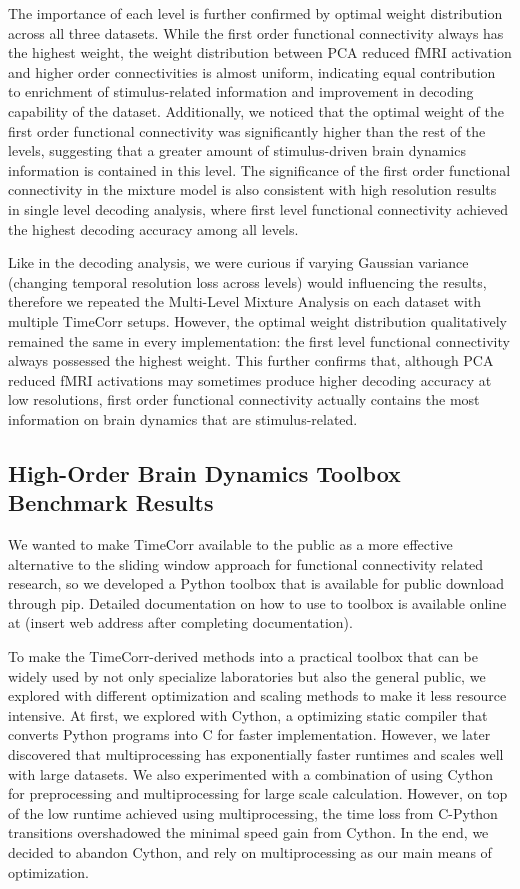 \documentclass[11pt]{article}
\begin{document}
The importance of each level is further confirmed by optimal weight distribution across all three datasets. While the first order functional connectivity always has the highest weight, the weight distribution between PCA reduced fMRI activation and higher order connectivities is almost uniform, indicating equal contribution to enrichment of stimulus-related information and improvement in decoding capability of the dataset. Additionally, we noticed that the optimal weight of the first order functional connectivity was significantly higher than the rest of the levels, suggesting that a greater amount of stimulus-driven brain dynamics information is contained in this level. The significance of the first order functional connectivity in the mixture model is also consistent with high resolution results in single level decoding analysis, where first level functional connectivity achieved the highest decoding accuracy among all levels.

Like in the decoding analysis, we were curious if varying Gaussian variance (changing temporal resolution loss across levels) would influencing the results, therefore we repeated the Multi-Level Mixture Analysis on each dataset with multiple TimeCorr setups. However, the optimal weight distribution qualitatively remained the same in every implementation: the first level functional connectivity always possessed the highest weight. This further confirms that, although PCA reduced fMRI activations may sometimes produce higher decoding accuracy at low resolutions, first order functional connectivity actually contains the most information on brain dynamics that are stimulus-related.

\subsection{High-Order Brain Dynamics Toolbox Benchmark Results}
We wanted to make TimeCorr available to the public as a more effective alternative to the sliding window approach for functional connectivity related research, so we developed a Python toolbox that is available for public download through pip. Detailed documentation on how to use to toolbox is available online at (insert web address after completing documentation).

To make the TimeCorr-derived methods into a practical toolbox that can be widely used by not only specialize laboratories but also the general public, we explored with different optimization and scaling methods to make it less resource intensive. At first, we explored with Cython, a optimizing static compiler that converts Python programs into C for faster implementation. However, we later discovered that multiprocessing has exponentially faster runtimes and scales well with large datasets. We also experimented with a combination of using Cython for preprocessing and multiprocessing for large scale calculation. However, on top of the low runtime achieved using multiprocessing, the time loss from C-Python transitions overshadowed the minimal speed gain from Cython. In the end, we decided to abandon Cython, and rely on multiprocessing as our main means of optimization.
\end{document}
